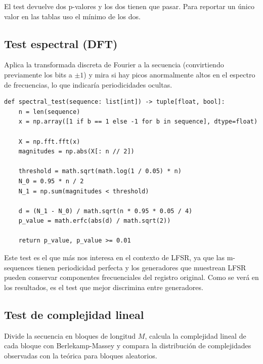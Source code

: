 El test devuelve dos p-valores y los dos tienen que pasar. Para reportar un único valor en las tablas uso el mínimo de los dos.

\subsection{Test espectral (DFT)}

Aplica la transformada discreta de Fourier a la secuencia (convirtiendo previamente los bits a $\pm 1$) y mira si hay picos
anormalmente altos en el espectro de frecuencias, lo que indicaría periodicidades ocultas.

\begin{lstlisting}[style=Python,caption={Test espectral (\texttt{src/tests\_nist/spectral.py}).}]
def spectral_test(sequence: list[int]) -> tuple[float, bool]:
    n = len(sequence)
    x = np.array([1 if b == 1 else -1 for b in sequence], dtype=float)

    X = np.fft.fft(x)
    magnitudes = np.abs(X[: n // 2])

    threshold = math.sqrt(math.log(1 / 0.05) * n)
    N_0 = 0.95 * n / 2
    N_1 = np.sum(magnitudes < threshold)

    d = (N_1 - N_0) / math.sqrt(n * 0.95 * 0.05 / 4)
    p_value = math.erfc(abs(d) / math.sqrt(2))

    return p_value, p_value >= 0.01
\end{lstlisting}

Este test es el que más nos interesa en el contexto de LFSR, ya que las m-sequences tienen periodicidad perfecta y los generadores que muestrean LFSR
pueden conservar componentes frecuenciales del registro original. Como se verá en los resultados, es el test que mejor discrimina entre generadores.

\subsection{Test de complejidad lineal}

Divide la secuencia en bloques de longitud $M$, calcula la complejidad lineal de cada bloque con Berlekamp-Massey y compara la distribución de complejidades observadas
con la teórica para bloques aleatorios.

